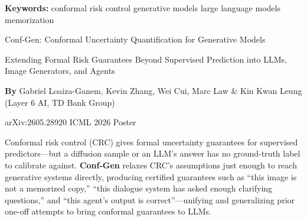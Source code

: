 \documentclass[10pt,twocolumn]{article}
\begin{document}
\setlength{\parindent}{0pt}
\setlength{\parskip}{4pt}

{\small\color{keywordgray}\textbf{Keywords:}
  conformal risk control \textbullet{}
  generative models \textbullet{}
  large language models \textbullet{}
  memorization}\par\vspace{4pt}

{\LARGE\bfseries\raggedright
  Conf-Gen: Conformal Uncertainty Quantification for Generative
  Models}\par\vspace{4pt}

{\large\itshape\raggedright
  Extending Formal Risk Guarantees Beyond Supervised Prediction into
  LLMs, Image Generators, and Agents}\par\vspace{6pt}

{\small\textbf{By} Gabriel Loaiza-Ganem, Kevin Zhang, Wei Cui, Marc Law
  \& Kin Kwan Leung
  (Layer 6 AI, TD Bank Group)}\par\vspace{2pt}

{\small\color{keywordgray}arXiv:2605.28920 \textbullet{}
  ICML 2026 Poster}
\par\vspace{2pt}\noindent{\color{rulered}\rule{\columnwidth}{0.6pt}}\vspace{6pt}

Conformal risk control (CRC) gives formal uncertainty guarantees for
supervised predictors---but a diffusion sample or an LLM's answer has
no ground-truth label to calibrate against. \textbf{Conf-Gen} relaxes
CRC's assumptions just enough to reach generative systems directly,
producing certified guarantees such as ``this image is not a memorized
copy,'' ``this dialogue system has asked enough clarifying questions,''
and ``this agent's output is correct''---unifying and generalizing
prior one-off attempts to bring conformal guarantees to LLMs.
\end{document}
